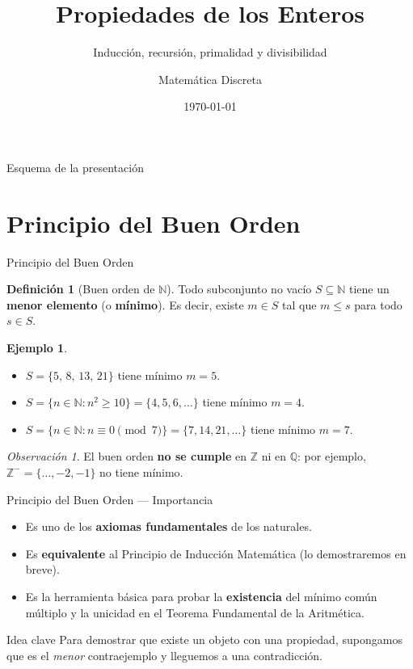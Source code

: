 \documentclass[10pt,aspectratio=169]{beamer}
\title{Propiedades de los Enteros}
\subtitle{Inducción, recursión, primalidad y divisibilidad}
\author{Matemática Discreta}
\date{\today}
\theoremstyle{definition}
\newtheorem{definicion}{Definición}
\newtheorem{ejemplo}{Ejemplo}
\theoremstyle{plain}
\theoremstyle{remark}
\newtheorem*{observacion}{Observación}
\newcommand{\N}{\mathbb{N}}
\newcommand{\Z}{\mathbb{Z}}
\newcommand{\Q}{\mathbb{Q}}
\begin{document}
\begin{frame}
  \titlepage
\end{frame}

\begin{frame}{Esquema de la presentación}
  \tableofcontents
\end{frame}

\section{Principio del Buen Orden}
\begin{frame}{Principio del Buen Orden}
  \begin{definicion}[Buen orden de $\N$]
    Todo subconjunto no vacío $S\subseteq\N$ tiene un \textbf{menor elemento} (o
    \textbf{mínimo}). Es decir, existe $m\in S$ tal que $m\le s$ para todo
    $s\in S$.
  \end{definicion}
  \vspace{0.4em}
  \begin{ejemplo}
    \begin{itemize}
      \item $S=\{5,\,8,\,13,\,21\}$ tiene mínimo $m=5$.
      \item $S=\{n\in\N : n^2\ge 10\} = \{4,5,6,\dots\}$ tiene mínimo $m=4$.
      \item $S=\{n\in\N : n\equiv 0 \pmod 7\} = \{7,14,21,\dots\}$ tiene mínimo
            $m=7$.
    \end{itemize}
  \end{ejemplo}
  \begin{observacion}
    El buen orden \textbf{no se cumple} en $\Z$ ni en $\Q$: por ejemplo,
    $\Z^- = \{\dots,-2,-1\}$ no tiene mínimo.
  \end{observacion}
\end{frame}

\begin{frame}{Principio del Buen Orden — Importancia}
  \begin{itemize}
    \item Es uno de los \textbf{axiomas fundamentales} de los naturales.
    \item Es \textbf{equivalente} al Principio de Inducción Matemática
          (lo demostraremos en breve).
    \item Es la herramienta básica para probar la \textbf{existencia} del
          mínimo común múltiplo y la unicidad en el Teorema Fundamental
          de la Aritmética.
  \end{itemize}
  \vspace{0.4em}
  \begin{block}{Idea clave}
    Para demostrar que existe un objeto con una propiedad, supongamos
    que es el \emph{menor} contraejemplo y lleguemos a una contradicción.
  \end{block}
\end{frame}
\end{document}
